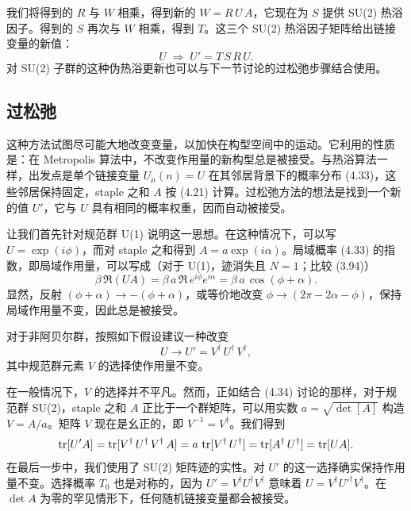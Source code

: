 我们将得到的 $R$ 与 $W$ 相乘，得到新的 $W = R\,U\,A$，它现在为 $S$ 提供 SU(2) 热浴因子。得到的 $S$ 再次与 $W$ 相乘，得到 $T$。这三个 SU(2) 热浴因子矩阵给出链接变量的新值：
\begin{equation}
  U \;\Rightarrow\; U' = T\,S\,R\,U .
\end{equation}
对 SU(2) 子群的这种伪热浴更新也可以与下一节讨论的过松弛步骤结合使用。

\subsection{过松弛}

这种方法试图尽可能大地改变变量，以加快在构型空间中的运动。它利用的性质是：在 Metropolis 算法中，不改变作用量的新构型总是被接受。与热浴算法一样，出发点是单个链接变量 $U_\mu(n) = U$ 在其邻居背景下的概率分布 (4.33)，这些邻居保持固定，staple 之和 $A$ 按 (4.21) 计算。过松弛方法的想法是找到一个新的值 $U'$，它与 $U$ 具有相同的概率权重，因而自动被接受。

让我们首先针对规范群 U(1) 说明这一思想。在这种情况下，可以写 $U = \exp(i\phi)$，而对 staple 之和得到 $A = a\exp(i\alpha)$。局域概率 (4.33) 的指数，即局域作用量，可以写成（对于 U(1)，迹消失且 $N = 1$；比较 (3.94)）
\begin{equation}
  \beta\,\Re(U A) = \beta\,a\,\Re\,e^{i\phi}e^{i\alpha} = \beta\,a\,\cos(\phi + \alpha).
\end{equation}
显然，反射 $(\phi + \alpha) \to -(\phi + \alpha)$，或等价地改变 $\phi \to (2\pi - 2\alpha - \phi)$，保持局域作用量不变，因此总是被接受。

对于非阿贝尔群，按照如下假设建议一种改变
\begin{equation}
  U \to U' = V^\dagger\,U^\dagger\,V^\dagger,
\end{equation}
其中规范群元素 $V$ 的选择使作用量不变。

在一般情况下，$V$ 的选择并不平凡。然而，正如结合 (4.34) 讨论的那样，对于规范群 SU(2)，staple 之和 $A$ 正比于一个群矩阵，可以用实数 $a = \sqrt{\det[A]}$ 构造 $V = A/a$。矩阵 $V$ 现在是幺正的，即 $V^{-1} = V^\dagger$。我们得到
\begin{equation}
  \operatorname{tr}[U' A] = \operatorname{tr}[V^\dagger\,U^\dagger\,V^\dagger\,A] = a\,\operatorname{tr}[V^\dagger\,U^\dagger]
  = \operatorname{tr}[A^\dagger\,U^\dagger] = \operatorname{tr}[U A].
\end{equation}
在最后一步中，我们使用了 SU(2) 矩阵迹的实性。对 $U'$ 的这一选择确实保持作用量不变。选择概率 $T_0$ 也是对称的，因为 $U' = V^\dagger U^\dagger V^\dagger$ 意味着 $U = V^\dagger U'^\dagger V^\dagger$。在 $\det A$ 为零的罕见情形下，任何随机链接变量都会被接受。

